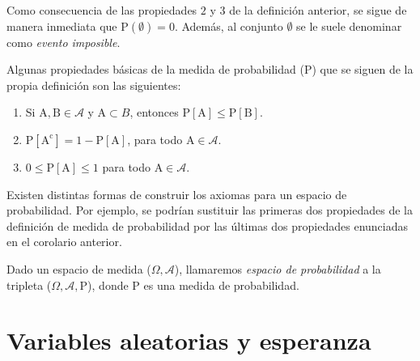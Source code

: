 \begin{observacion}
Como consecuencia de las propiedades $2$ y $3$ de la definición anterior, se sigue de manera inmediata que $\mathrm{P}(\emptyset) = 0$. Además, al conjunto $\emptyset$ se le suele denominar como \emph{evento imposible}.\newline
\end{observacion}

\begin{corolario}\label{cor:propiedades-adicionales}
    Algunas propiedades básicas de la medida de probabilidad ($\mathrm{P}$) que se siguen de la propia definición son las siguientes:

    \begin{enumerate}
        \item Si $\mathrm{A}, \mathrm{B} \in \mathcal{A}$ y $\mathrm{A} \subset B$, entonces $\mathrm{P}[\mathrm{A}] \le \mathrm{P}[\mathrm{B}]$.
        \item $\mathrm{P}[\mathrm{A^c}] = 1-\mathrm{P}[\mathrm{A}]$, para todo $\mathrm{A} \in \mathcal{A}$.
        \item $0 \le \mathrm{P}[\mathrm{A}] \le 1$ para todo $\mathrm{A} \in \mathcal{A}$.\newline
    \end{enumerate}
\end{corolario}

\begin{observacion}
Existen distintas formas de construir los axiomas para un espacio de probabilidad. Por ejemplo, se podrían sustituir las primeras dos propiedades de la definición de medida de probabilidad por las últimas dos propiedades enunciadas en el corolario anterior.\newline
\end{observacion}

\begin{definicion}\label{def:espacio-de-probabilidad}
    Dado un espacio de medida ($\Omega, \mathcal{A}$), llamaremos \emph{espacio de probabilidad} a la tripleta ($\Omega, \mathcal{A}, \mathrm{P}$), donde $\mathrm{P}$ es una medida de probabilidad.\newline
\end{definicion}

\section{Variables aleatorias y esperanza}


